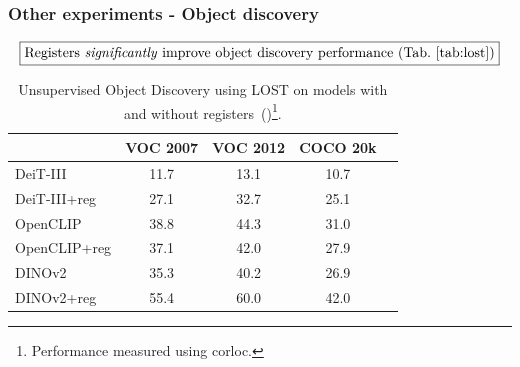 \documentclass[aspectratio=169]{beamer}
\begin{document}
\begin{frame}
\frametitle{Other experiments - Object discovery}

$$
\boxed{\text{Registers \emph{significantly} improve object discovery performance (Tab.~\ref{tab:lost})}}
$$

\begin{table}[t]
    \centering
    \begin{tabular}{@{}l c ccc@{}}
        \toprule
                    & VOC 2007 & VOC 2012  & COCO 20k \\
        \midrule
      DeiT-III      & 11.7 & 13.1 & 10.7 \\
      DeiT-III+reg  & 27.1 & 32.7 & 25.1 \\
      \midrule
      OpenCLIP      & 38.8 & 44.3 & 31.0 \\
      OpenCLIP+reg  & 37.1 & 42.0 & 27.9 \\
      \midrule
      DINOv2        & 35.3 & 40.2 & 26.9 \\
      DINOv2+reg    & 55.4 & 60.0 & 42.0 \\
        \bottomrule
    \end{tabular}
    \caption{
      Unsupervised Object Discovery using LOST on models with and without registers~(\cite{darcetVisionTransformersNeed2024})\footnote{Performance measured using corloc.}.
    }  
    \label{tab:lost}
\end{table}
\end{frame}
\end{document}
